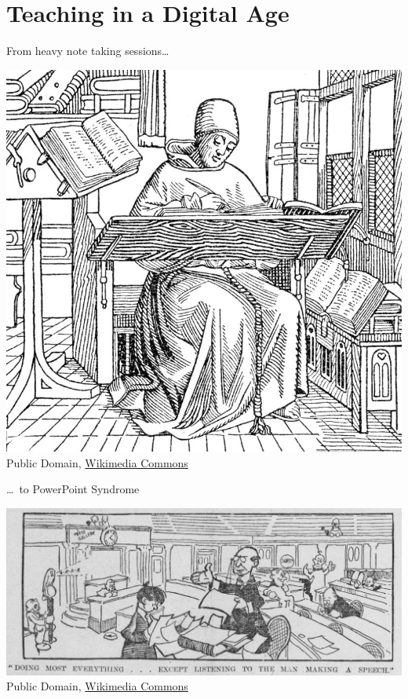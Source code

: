 
\section{Teaching in a Digital Age}

\begin{frame}
  \centering
  From heavy note taking sessions\dots \\
  \begin{minipage}{0.55\linewidth}
    \includegraphics[width=\linewidth,keepaspectratio]{796px-Monkcopyistwoodcut} \\
    \tiny Public Domain, \href{https://commons.wikimedia.org/wiki/File:Monkcopyistwoodcut.jpg}{Wikimedia Commons}
  \end{minipage}
\end{frame}

\begin{frame}
  \centering
  \dots\ to PowerPoint Syndrome \\
  \begin{minipage}{\linewidth}
    \includegraphics[width=\linewidth,keepaspectratio]{Satterfield_watches_Congress_be_boring} \\
    \tiny Public Domain, \href{https://commons.wikimedia.org/wiki/File:Satterfield_watches_Congress_be_boring.jpg}{Wikimedia Commons}
  \end{minipage}
\end{frame}

